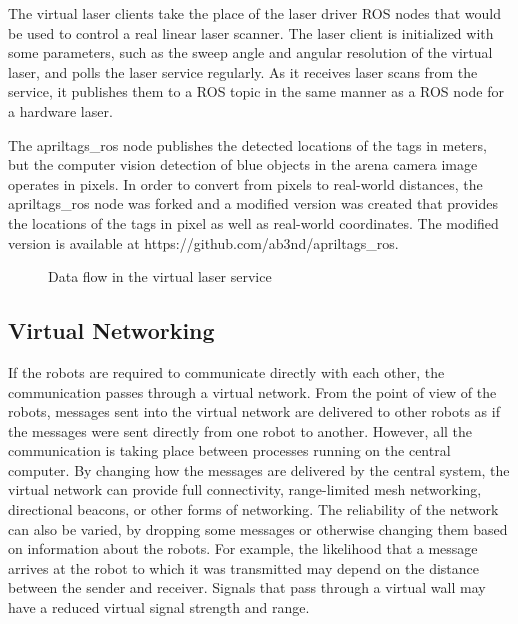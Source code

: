 The virtual laser clients take the place of the laser driver ROS nodes that would be used to control a real linear laser scanner. 
The laser client is initialized with some parameters, such as the sweep angle and angular resolution of the virtual laser, and polls the laser service regularly. 
As it receives laser scans from the service, it publishes them to a ROS topic in the same manner as a ROS node for a hardware laser. 

The apriltags\_ros node publishes the detected locations of the tags in meters, but the computer vision detection of blue objects in the arena camera image operates in pixels. 
In order to convert from pixels to real-world distances, the apriltags\_ros node was forked and a modified version was created that provides the locations of the tags in pixel as well as real-world coordinates. 
The modified version is available at https://github.com/ab3nd/apriltags\_ros.

\begin{figure}
 	\centering
	\caption{Data flow in the virtual laser service}
\end{figure}

\subsection{Virtual Networking} \label{section:Virtual_Networking}

If the robots are required to communicate directly with each other, the communication passes through a virtual network.
From the point of view of the robots, messages sent into the virtual network are delivered to other robots as if the messages were sent directly from one robot to another. 
However, all the communication is taking place between processes running on the central computer.
By changing how the messages are delivered by the central system, the virtual network can provide full connectivity, range-limited mesh networking, directional beacons, or other forms of networking. 
The reliability of the network can also be varied, by dropping some messages or otherwise changing them based on information about the robots. 
For example, the likelihood that a message arrives at the robot to which it was transmitted may depend on the distance between the sender and receiver.
Signals that pass through a virtual wall may have a reduced virtual signal strength and range.


